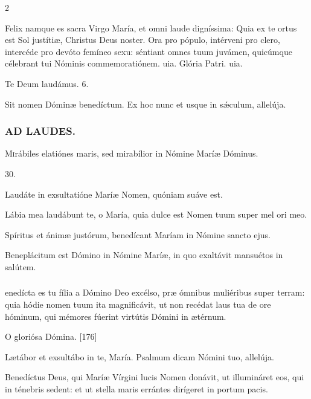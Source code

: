 \documentclass[9pt,twoside]{extarticle}
\begin{document}
\begin{multicols}{2}
\begin{tightlist}{}
\item {} Felix namque es sacra Virgo María, et omni laude digníssima: \textred{*} Quia ex te ortus est Sol justítiæ, Christus Deus noster.  Ora pro pópulo, intérveni pro clero, intercéde pro devóto femíneo sexu: séntiant omnes tuum juvámen, quicúmque célebrant tui Nóminis commemoratiónem. uia. Glória Patri. uia.
\item Te Deum laudámus. 6.
\item {} Sit nomen Dóminæ benedíctum.  Ex hoc nunc et usque in sǽculum, allelúja.
\end{tightlist}

\subsubsection*{\center \textsc{AD LAUDES.}}
\begin{center}\end{center}
\lettrine{M}irábiles elatiónes maris, sed mirabílior in Nómine Maríæ Dóminus.

\begin{tightlist}{}
\item {} 30.
\item {} Laudáte in exsultatióne Maríæ Nomen, quóniam suáve est.
\item {} Lábia mea laudábunt te, o María, quia dulce est Nomen tuum super mel ori meo.
\item {} Spíritus et ánimæ justórum, benedícant Maríam in Nómine sancto ejus.
\item {} Beneplácitum est Dómino in Nómine Maríæ, in quo exaltávit mansuétos in salútem.
\end{tightlist}

\subsubsection*{}
enedícta es tu fília a Dómino Deo excélso, præ ómnibus muliéribus super terram: quia hódie nomen tuum ita magnificávit, ut non recédat laus tua de ore hóminum, qui mémores fúerint virtútis Dómini in ætérnum.

\begin{tightlist}{}
\item {} O gloriósa Dómina. [176]
\item {} Lætábor et exsultábo in te, María.  Psalmum dicam Nómini tuo, allelúja.
\item {} Benedíctus Deus, qui Maríæ Vírgini lucis Nomen donávit, ut illumináret eos, qui in ténebris sedent: et ut stella maris errántes dirígeret in portum pacis.
\end{tightlist}


\end{multicols}
\end{document}
